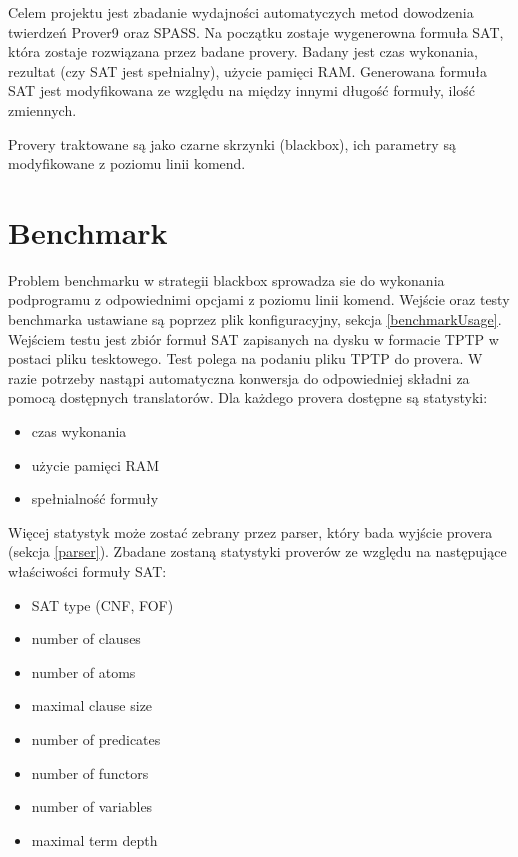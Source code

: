 \documentclass[a4paper,12pt]{article}
\begin{document}
Celem projektu jest zbadanie wydajności automatyczych metod dowodzenia twierdzeń Prover9 oraz SPASS. Na początku zostaje wygenerowna formuła \gls{SAT}, która zostaje rozwiązana przez badane provery. Badany jest czas wykonania, rezultat (czy \gls{SAT} jest spełnialny), użycie pamięci RAM.
Generowana formuła \gls{SAT} jest modyfikowana ze względu na między innymi długość formuły, ilość zmiennych.

Provery traktowane są jako czarne skrzynki (blackbox), ich parametry są modyfikowane z poziomu linii komend.

\section{Benchmark}

Problem benchmarku w strategii blackbox sprowadza sie do wykonania podprogramu z odpowiednimi opcjami z poziomu linii komend.
Wejście oraz testy benchmarka ustawiane są poprzez plik konfiguracyjny, sekcja \ref{benchmarkUsage}.  Wejściem testu jest zbiór formuł \gls{SAT} zapisanych na dysku w formacie TPTP w postaci pliku tesktowego. Test polega na podaniu pliku TPTP do provera. W razie potrzeby nastąpi automatyczna konwersja do odpowiedniej składni za pomocą dostępnych translatorów.
Dla każdego provera dostępne są statystyki:

\begin{itemize}
  \item czas wykonania
  \item użycie pamięci RAM
  \item spełnialność formuły
\end{itemize}

\noindent
Więcej statystyk może zostać zebrany przez parser, który bada wyjście provera (sekcja \ref{parser}).
\newline
Zbadane zostaną statystyki proverów ze względu na następujące właściwości formuły SAT:

\begin{itemize}
  \item SAT type (CNF, FOF)
  \item number of clauses
  \item number of atoms
  \item maximal clause size
  \item number of predicates
  \item number of functors
  \item number of variables
  \item maximal term depth
\end{itemize}
\end{document}
